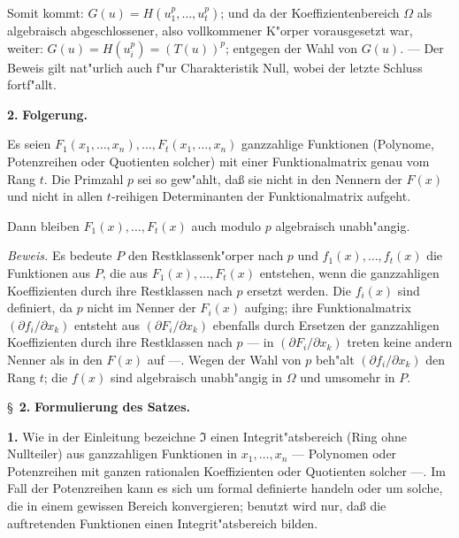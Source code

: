 Somit kommt: $G(u)=H(u_1^p,\ldots,u_t^p)$; und da der Koeffizientenbereich $\Omega$ als algebraisch abgeschlossener, also vollkommener K"orper vorausgesetzt war, weiter: $G(u)=H(u_i^p)=(T(u))^p$; entgegen der Wahl von $G(u)$. --- Der Beweis gilt nat"urlich auch f"ur Charakteristik Null, wobei der letzte Schluss fortf"allt.

\medskip\noindent\textbf{2.} \textbf{Folgerung.}

Es seien $F_1(x_1,\ldots,x_n),\ldots,F_t(x_1,\ldots,x_n)$ ganzzahlige Funktionen (Polynome, Potenzreihen oder Quotienten solcher) mit einer Funktionalmatrix genau vom Rang $t$. Die Primzahl $p$ sei so gew"ahlt, da\ss{} sie nicht in den Nennern der $F(x)$ und nicht in allen $t$-reihigen Determinanten der Funktionalmatrix aufgeht.

Dann bleiben $F_1(x),\ldots,F_t(x)$ auch modulo $p$ algebraisch unabh"angig.

\noindent\textit{Beweis.}
Es bedeute $P$ den Restklassenk"orper nach $p$ und $f_1(x),\ldots,f_t(x)$ die Funktionen aus $P$, die aus $F_1(x),\ldots,F_t(x)$ entstehen, wenn die ganzzahligen Koeffizienten durch ihre Restklassen nach $p$ ersetzt werden. Die $f_i(x)$ sind definiert, da $p$ nicht im Nenner der $F_i(x)$ aufging; ihre Funktionalmatrix $(\partial f_i/\partial x_k)$ entsteht aus $(\partial F_i/\partial x_k)$ ebenfalls durch Ersetzen der ganzzahligen Koeffizienten durch ihre Restklassen nach $p$ --- in $(\partial F_i/\partial x_k)$ treten keine andern Nenner als in den $F(x)$ auf ---. Wegen der Wahl von $p$ beh"alt $(\partial f_i/\partial x_k)$ den Rang $t$; die $f(x)$ sind algebraisch unabh"angig in $\Omega$ und umsomehr in $P$.

\bigskip
\S~\textbf{2.}
\textbf{Formulierung des Satzes.}

\smallskip

\noindent\textbf{1.}
Wie in der Einleitung bezeichne $\mathfrak{I}$ einen Integrit"atsbereich (Ring ohne Nullteiler) aus ganzzahligen Funktionen in $x_1,\ldots,x_n$ --- Polynomen oder Potenzreihen mit ganzen rationalen Koeffizienten oder Quotienten solcher ---. Im Fall der Potenzreihen kann es sich um formal definierte handeln oder um solche, die in einem gewissen Bereich konvergieren; benutzt wird nur, da\ss{} die auftretenden Funktionen einen Integrit"atsbereich bilden.

